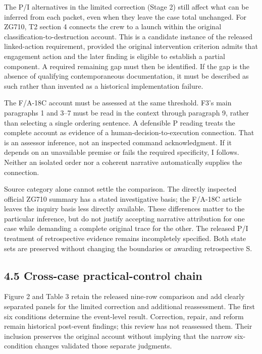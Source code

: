 \documentclass[11pt]{article}
\begin{document}
The P/I alternatives in the limited correction (Stage 2) still affect what can be inferred from each packet, even when they leave the case total unchanged. For ZG710, T2 section 4 connects the crew to a launch within the original classification-to-destruction account. This is a candidate instance of the released linked-action requirement, provided the original intervention criterion admits that engagement action and the later finding is eligible to establish a partial component. A required remaining gap must then be identified. If the gap is the absence of qualifying contemporaneous documentation, it must be described as such rather than invented as a historical implementation failure.

The F/A-18C account must be assessed at the same threshold. F3's main paragraphs 1 and 3--7 must be read in the context through paragraph 9, rather than selecting a single ordering sentence. A defensible P reading treats the complete account as evidence of a human-decision-to-execution connection. That is an assessor inference, not an inspected command acknowledgment. If it depends on an unavailable premise or fails the required specificity, I follows. Neither an isolated order nor a coherent narrative automatically supplies the connection.

Source category alone cannot settle the comparison. The directly inspected official ZG710 summary has a stated investigative basis; the F/A-18C article leaves the inquiry basis less directly available. These differences matter to the particular inference, but do not justify accepting narrative attribution for one case while demanding a complete original trace for the other. The released P/I treatment of retrospective evidence remains incompletely specified. Both state sets are preserved without changing the boundaries or awarding retrospective S.

\subsection*{4.5 Cross-case practical-control chain}

Figure 2 and Table 3 retain the released nine-row comparison and add clearly separated panels for the limited correction and additional reassessment. The first six conditions determine the event-level result. Correction, repair, and reform remain historical post-event findings; this review has not reassessed them. Their inclusion preserves the original account without implying that the narrow six-condition changes validated those separate judgments.
\end{document}
